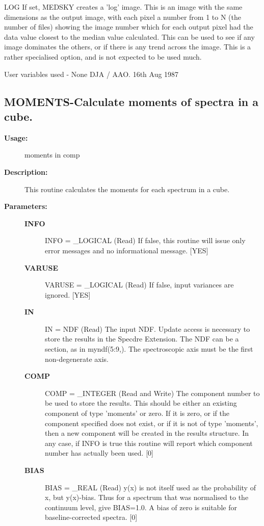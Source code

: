 \begin{description}
\begin{description}
\begin{terminalv}
 LOG    If set, MEDSKY creates a 'log' image.  This is an
        image with the same dimensions as the output image, with
        each pixel a number from 1 to N (the number of files)
        showing the image number which for each output pixel had
        the data value closest to the median value calculated.
        This can be used to see if any image dominates the others,
        or if there is any trend across the image. This is a rather
        specialised option, and is not expected to be used much.

 User variables used - None
                                  DJA / AAO. 16th Aug 1987
\end{terminalv}
\end{description}
\subsection{MOMENTS-\label{MOMENTS}Calculate moments of spectra in a cube.}
\begin{description}

\item [\textbf{Usage:}]

   moments in comp


\item [\textbf{Description:}]

   This routine calculates the moments for each spectrum in a cube.


\item [\textbf{Parameters:}]
\begin{description}
\item [\textbf{INFO}]
INFO = \_LOGICAL (Read)
   If false, this routine will issue only error messages and no
   informational message. [YES]
\item [\textbf{VARUSE}]
VARUSE = \_LOGICAL (Read)
   If false, input variances are ignored. [YES]
\item [\textbf{IN}]
IN = NDF (Read)
   The input NDF. Update access is necessary to store the results
   in the Specdre Extension. The NDF can be a section, as in
   myndf(5:9,). The spectroscopic axis must be the first
   non-degenerate axis.
\item [\textbf{COMP}]
COMP = \_INTEGER (Read and Write)
   The component number to be used to store the results. This
   should be either an existing component of type 'moments' or
   zero. If it is zero, or if the component specified does not
   exist, or if it is not of type 'moments', then a new component
   will be created in the results structure. In any case, if INFO
   is true this routine will report which component number has
   actually been used. [0]
\item [\textbf{BIAS}]
BIAS = \_REAL (Read)
   y(x) is not itself used as the probability of x, but y(x)-bias.
   Thus for a spectrum that was normalised to the continuum level,
   give BIAS=1.0. A bias of zero is suitable for baseline-corrected
   spectra. [0]
\end{description}


\end{description}
\end{description}
